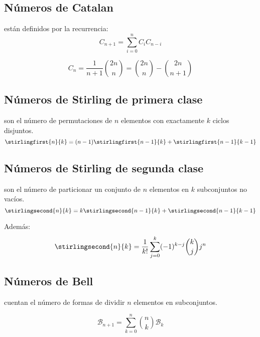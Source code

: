     \subsection{Números de Catalan} están definidos por la recurrencia:
      \begin{equation*}
        C_{n+1} = \sum_{i=0}^nC_iC_{n-i}
      \end{equation*}

      \begin{equation*}
        C_n = \frac{1}{n+1}\binom{2n}{n} = \binom{2n}{n} - \binom{2n}{n+1}
      \end{equation*}

    \subsection{Números de Stirling de primera clase} son el número de permutaciones de $n$ elementos con exactamente $k$ ciclos disjuntos.
      \begin{equation*}
        \stirlingfirst{n}{k} = (n-1)\stirlingfirst{n-1}{k} + \stirlingfirst{n-1}{k-1}
      \end{equation*}

    \subsection{Números de Stirling de segunda clase} son el número de particionar un conjunto de
      $n$ elementos en $k$ subconjuntos no vacíos.
      \begin{equation*}
        \stirlingsecond{n}{k} = k\stirlingsecond{n-1}{k} + \stirlingsecond{n-1}{k-1}
      \end{equation*}

      Además:
      \begin{equation*}
        \stirlingsecond{n}{k} = \frac{1}{k!}\sum_{j=0}^k (-1)^{k-j} \binom{k}{j} j^n
      \end{equation*}

      \subsection{Números de Bell} cuentan el número de formas de dividir $n$ elementos en subconjuntos.

      \begin{equation*}
        \mathcal{B}_{n+1} = \sum_{k=0}^n \binom{n}{k} \mathcal{B}_k
      \end{equation*}


